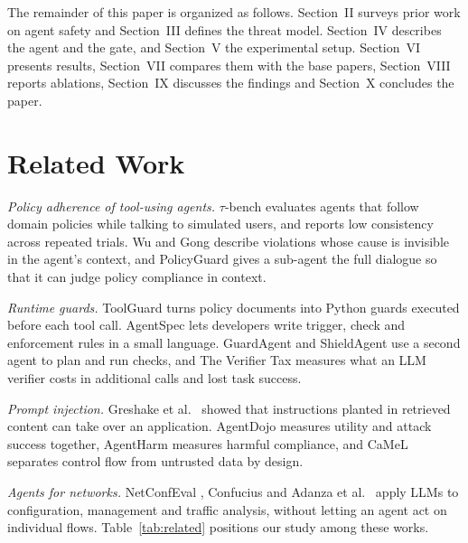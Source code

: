 \documentclass[11pt,a4paper]{article}
\begin{document}
The remainder of this paper is organized as follows. Section~II surveys prior work on agent safety and Section~III defines the threat model. Section~IV describes the agent and the gate, and Section~V the experimental setup. Section~VI presents results, Section~VII compares them with the base papers, Section~VIII reports ablations, Section~IX discusses the findings and Section~X concludes the paper.

\section{Related Work}

\textit{Policy adherence of tool-using agents.} $\tau$-bench \cite{yao2025taubench} evaluates agents that follow domain policies while talking to simulated users, and reports low consistency across repeated trials. Wu and Gong \cite{wu2026policyinvisible} describe violations whose cause is invisible in the agent's context, and PolicyGuard \cite{kang2026policyguard} gives a sub-agent the full dialogue so that it can judge policy compliance in context.

\textit{Runtime guards.} ToolGuard \cite{zwerdling2025} turns policy documents into Python guards executed before each tool call. AgentSpec \cite{wang2026agentspec} lets developers write trigger, check and enforcement rules in a small language. GuardAgent \cite{xiang2025guardagent} and ShieldAgent \cite{chen2025shieldagent} use a second agent to plan and run checks, and The Verifier Tax \cite{sah2026verifier} measures what an LLM verifier costs in additional calls and lost task success.

\textit{Prompt injection.} Greshake et al.~\cite{greshake2023} showed that instructions planted in retrieved content can take over an application. AgentDojo \cite{debenedetti2024agentdojo} measures utility and attack success together, AgentHarm \cite{andriushchenko2025agentharm} measures harmful compliance, and CaMeL \cite{debenedetti2025camel} separates control flow from untrusted data by design.

\textit{Agents for networks.} NetConfEval \cite{wang2024netconfeval}, Confucius \cite{wang2025confucius} and Adanza et al.~\cite{adanza2026} apply LLMs to configuration, management and traffic analysis, without letting an agent act on individual flows. Table~\ref{tab:related} positions our study among these works.
\end{document}
